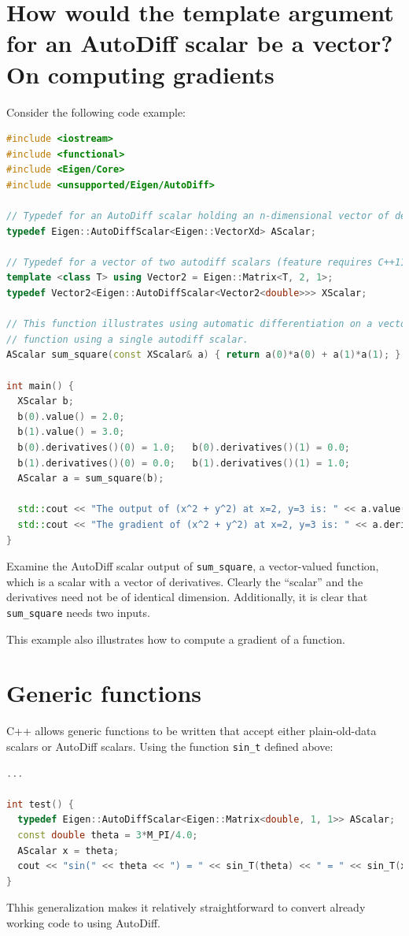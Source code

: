 \documentclass[letterpaper, 12 pt, onecolumn, journal]{IEEEtran}  %
\begin{document}
\section{How would the template argument for an AutoDiff scalar be a vector? On computing gradients}
Consider the following code example:
\begin{lstlisting}[language=C++]
#include <iostream>
#include <functional>
#include <Eigen/Core>
#include <unsupported/Eigen/AutoDiff>

// Typedef for an AutoDiff scalar holding an n-dimensional vector of derivatives.
typedef Eigen::AutoDiffScalar<Eigen::VectorXd> AScalar;

// Typedef for a vector of two autodiff scalars (feature requires C++11). 
template <class T> using Vector2 = Eigen::Matrix<T, 2, 1>;
typedef Vector2<Eigen::AutoDiffScalar<Vector2<double>>> XScalar;

// This function illustrates using automatic differentiation on a vector
// function using a single autodiff scalar.
AScalar sum_square(const XScalar& a) { return a(0)*a(0) + a(1)*a(1); }

int main() {
  XScalar b;
  b(0).value() = 2.0;
  b(1).value() = 3.0;
  b(0).derivatives()(0) = 1.0;   b(0).derivatives()(1) = 0.0;
  b(1).derivatives()(0) = 0.0;   b(1).derivatives()(1) = 1.0;
  AScalar a = sum_square(b);

  std::cout << "The output of (x^2 + y^2) at x=2, y=3 is: " << a.value() << std::endl; 
  std::cout << "The gradient of (x^2 + y^2) at x=2, y=3 is: " << a.derivatives() << std::endl; 
}
\end{lstlisting}

Examine the AutoDiff scalar output of \texttt{sum\_square}, a vector-valued function, which is a scalar with a vector of derivatives. Clearly the ``scalar'' and the derivatives need not be of identical dimension. Additionally, it is clear that \texttt{sum\_square} needs two inputs.

This example also illustrates how to compute a gradient of a function. 

\section{Generic functions}
C++ allows generic functions to be written that accept either plain-old-data scalars or AutoDiff scalars. Using the function \texttt{sin\_t} defined above:
\begin{lstlisting}[language=C++]
...

int test() {
  typedef Eigen::AutoDiffScalar<Eigen::Matrix<double, 1, 1>> AScalar;
  const double theta = 3*M_PI/4.0;
  AScalar x = theta;
  cout << "sin(" << theta << ") = " << sin_T(theta) << " = " << sin_T(x).value() << endl;
}
\end{lstlisting}
Thhis generalization makes it relatively straightforward to convert already working code to using AutoDiff.
\end{document}
